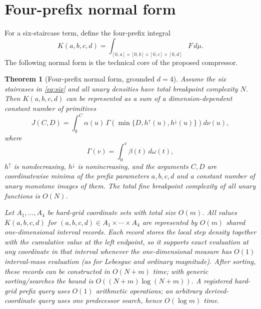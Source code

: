 \documentclass[12pt,a4paper]{article}
\newtheorem{theorem}{Theorem}
\theoremstyle{definition}
\newcommand{\1}{\mathbf 1}
\begin{document}
\section{Four-prefix normal form}

For a six-staircase term, define the four-prefix integral
\begin{equation}
K(a,b,c,d)=\int_{[0,a]\times[0,b]\times[0,c]\times[0,d]}F\,d\mu.   \label{eq:K4}
\end{equation}
The following normal form is the technical core of the proposed compressor.

\begin{theorem}[Four-prefix normal form, grounded $d=4$]        \label{thm:prefix}
Assume the six staircases in \eqref{eq:six} and all unary densities have total breakpoint complexity $N$. Then $K(a,b,c,d)$ can be represented as a sum of a dimension-dependent constant number of primitives
\begin{equation}
J(C,D)=\int_0^C \alpha(u)\,
\Gamma\!\left(\min\{D,h^\uparrow(u),h^\downarrow(u)\}\right)d\nu(u),  \label{eq:J}
\end{equation}
where
\[
\Gamma(v)=\int_0^v\beta(t)\,d\omega(t),
\]
$h^\uparrow$ is nondecreasing, $h^\downarrow$ is nonincreasing, and the arguments $C,D$ are coordinatewise minima of the prefix parameters $a,b,c,d$ and a constant number of unary monotone images of them. The total fine breakpoint complexity of all unary functions is $O(N)$.

Let $A_1,\dots,A_4$ be hard-grid coordinate sets with total size $O(m)$. All values $K(a,b,c,d)$ for $(a,b,c,d)\in A_1\times\cdots\times A_4$ are represented by $O(m)$ shared one-dimensional \emph{interval records}. Each record stores the local step density together with the cumulative value at the left endpoint, so it supports exact evaluation at any coordinate in that interval whenever the one-dimensional measure has $O(1)$ interval-mass evaluation (as for Lebesgue and ordinary magnitude). After sorting, these records can be constructed in $O(N+m)$ time; with generic sorting/searches the bound is $O((N+m)\log(N+m))$. A registered hard-grid prefix query uses $O(1)$ arithmetic operations; an arbitrary derived-coordinate query uses one predecessor search, hence $O(\log m)$ time.
\end{theorem}
\end{document}
